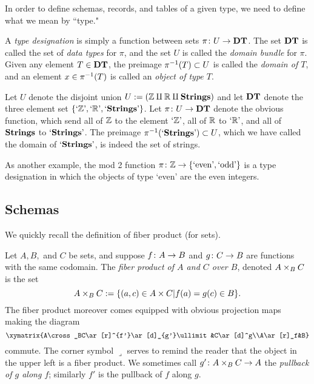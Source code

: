 \documentclass{amsart}
\def\DT{{\bf DT}}
\def\Strings{{\bf Strings}}
\def\'{\tn{'}}
\begin{document}
In order to define schemas, records, and tables of a given type, we need to define what we mean by ``type." 

\begin{definition}

A {\em type designation} is simply a function between sets $\pi\taking U\to \DT$.  The set $\DT$ is called the set of {\em data types} for $\pi$, and the set $U$ is called the {\em domain bundle} for $\pi$.  Given any element $T\in\DT$, the preimage $\pi^\m1(T)\ss U$ is called the {\em domain of $T$}, and an element $x\in\pi^\m1(T)$ is called an {\em object of type $T$}.

\end{definition}

\begin{example}\label{ex:type designation}

Let $U$ denote the disjoint union $U:=(\ZZ\amalg\RR\amalg\Strings)$ and let $\DT$ denote the three element set $\{`\ZZ\', `\RR\', `\Strings\'\}$.  Let $\pi\taking U\to\DT$ denote the obvious function, which send all of ${\mathbb Z}$ to the element $`\ZZ\'$, all of ${\mathbb R}$ to $`\RR\'$, and all of $\Strings$ to $`\Strings\'$. 
The preimage $\pi^\m1(`\Strings\')\ss U$, which we have called the domain of $`\Strings\'$, is indeed the set of strings.

As another example, the mod 2 function $\pi\colon{\mathbb Z}\rightarrow\{\textnormal{`even'},\textnormal{`odd'}\}$ is a type designation in which the objects of type `even' are the even integers.

\end{example}

\subsection{Schemas}

We quickly recall the definition of fiber product (for sets).

\begin{definition}

Let $A, B,$ and $C$ be sets, and suppose $f\colon A\rightarrow B$ and $g\colon C\rightarrow B$ are functions with the same codomain.  The {\em fiber product of $A$ and $C$ over $B$}, denoted $A\times_BC$ is the set $$A\times_BC:=\{(a,c)\in A\times C | f(a)=g(c)\in B\}.$$  The fiber product moreover comes equipped with obvious projection maps making the diagram $$\xymatrix{A\cross_BC\ar[r]^{f'}\ar[d]_{g'}\ullimit&C\ar[d]^g\\A\ar[r]_f&B}$$ commute.  The corner symbol $\lrcorner$ serves to remind the reader that the object in the upper left is a fiber product.   We sometimes call $g'\colon A\times_BC\rightarrow A$ the {\em pullback of $g$ along $f$}; similarly $f'$ is the pullback of $f$ along $g$.

\end{definition}
\end{document}
